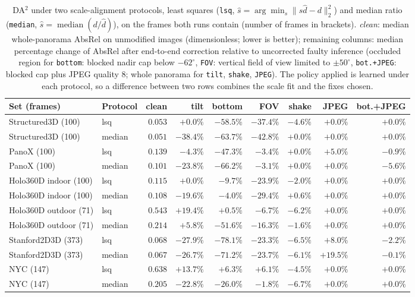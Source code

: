 \documentclass{article}
\newcommand{\absrel}{AbsRel}
\begin{document}
\begin{table}[ht]\centering\footnotesize\setlength{\tabcolsep}{3pt}
\caption{DA$^2$ under two scale-alignment protocols, least squares (\texttt{lsq}, $\hat s=\arg\min_s\|s\hat d-d\|_2^2$) and median ratio (\texttt{median}, $\hat s=\operatorname{median}(d/\hat d)$), on the frames both runs contain (number of frames in brackets). \emph{clean}: median whole-panorama \absrel{} on unmodified images (dimensionless; lower is better); remaining columns: median percentage change of \absrel{} after end-to-end correction relative to uncorrected faulty inference (occluded region for \texttt{bottom}: blocked nadir cap below $-62^\circ$, \texttt{FOV}: vertical field of view limited to $\pm50^\circ$, \texttt{bot.+JPEG}: blocked cap plus JPEG quality 8; whole panorama for \texttt{tilt}, \texttt{shake}, \texttt{JPEG}). The policy applied is learned under each protocol, so a difference between two rows combines the scale fit and the fixes chosen.}
\begin{tabular}{llrrrrrrr}\toprule
Set (frames) & Protocol & clean & tilt & bottom & FOV & shake & JPEG & bot.+JPEG\\\midrule
Structured3D (100) & lsq & $0.053$ & $+0.0\%$ & $-58.5\%$ & $-37.4\%$ & $-4.6\%$ & $+0.0\%$ & $+0.0\%$\\
Structured3D (100) & median & $0.051$ & $-38.4\%$ & $-63.7\%$ & $-42.8\%$ & $+0.0\%$ & $+0.0\%$ & $+0.0\%$\\
PanoX (100) & lsq & $0.139$ & $-4.3\%$ & $-47.3\%$ & $-3.4\%$ & $+0.0\%$ & $+5.0\%$ & $-0.9\%$\\
PanoX (100) & median & $0.101$ & $-23.8\%$ & $-66.2\%$ & $-3.1\%$ & $+0.0\%$ & $+0.0\%$ & $-5.6\%$\\
Holo360D indoor (100) & lsq & $0.115$ & $+0.0\%$ & $-9.7\%$ & $-23.9\%$ & $-2.0\%$ & $+0.0\%$ & $+0.0\%$\\
Holo360D indoor (100) & median & $0.108$ & $-19.6\%$ & $-4.0\%$ & $-29.4\%$ & $+0.6\%$ & $+0.0\%$ & $+0.0\%$\\
Holo360D outdoor (71) & lsq & $0.543$ & $+19.4\%$ & $+0.5\%$ & $-6.7\%$ & $-6.2\%$ & $+0.0\%$ & $+0.0\%$\\
Holo360D outdoor (71) & median & $0.214$ & $+5.8\%$ & $-51.6\%$ & $-16.3\%$ & $-1.6\%$ & $+0.0\%$ & $+0.0\%$\\
Stanford2D3D (373) & lsq & $0.068$ & $-27.9\%$ & $-78.1\%$ & $-23.3\%$ & $-6.5\%$ & $+8.0\%$ & $-2.2\%$\\
Stanford2D3D (373) & median & $0.067$ & $-26.7\%$ & $-71.2\%$ & $-23.7\%$ & $-6.1\%$ & $+19.5\%$ & $-0.1\%$\\
NYC (147) & lsq & $0.638$ & $+13.7\%$ & $+6.3\%$ & $+6.1\%$ & $-4.5\%$ & $+0.0\%$ & $+0.0\%$\\
NYC (147) & median & $0.205$ & $-22.8\%$ & $-26.0\%$ & $-1.8\%$ & $-6.7\%$ & $+0.0\%$ & $+0.0\%$\\
\bottomrule\end{tabular}
\end{table}
\end{document}
